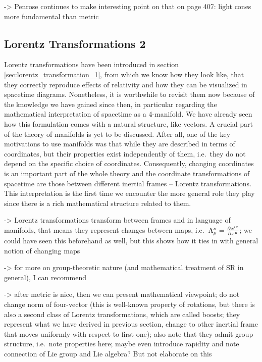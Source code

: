 \documentclass[../relativity_main.tex]{subfiles}
\begin{document}



-> Penrose continues to make interesting point on that on page 407: light cones more fundamental than metric



		\subsection{Lorentz Transformations 2}\label{subsec:lorentz_transformation_2}
Lorentz transformations have been introduced in section \ref{sec:lorentz_transformation_1}, from which we know how they look like, that they correctly reproduce effects of relativity and how they can be visualized in spacetime diagrams. Nonetheless, it is worthwhile to revisit them now because of the knowledge we have gained since then, in particular regarding the mathematical interpretation of spacetime as a 4-manifold. We have already seen how this formulation comes with a natural structure, like vectors. A crucial part of the theory of manifolds is yet to be discussed. After all, one of the key motivations to use manifolds was that while they are described in terms of coordinates, but their properties exist independently of them, i.e.~they do not depend on the specific choice of coordinates. Consequently, changing coordinates is an important part of the whole theory and the coordinate transformations of spacetime are those between different inertial frames -- Lorentz transformations. This interpretation is the first time we encounter the more general role they play since there is a rich mathematical structure related to them.



-> Lorentz transformations transform between frames and in language of manifolds, that means they represent changes between maps, i.e.~$\Lambda_\mu^\nu = \pdv{x'^\nu}{x^\mu}$; we could have seen this beforehand as well, but this shows how it ties in with general notion of changing maps



-> for more on group-theoretic nature (and mathematical treatment of SR in general), I can recommend \cite{giulini_srt_indepth}



-> after metric is nice, then we can present mathematical viewpoint; do not change norm of four-vector (this is well-known property of rotations, but there is also a second class of Lorentz transformations, which are called boosts; they represent what we have derived in previous section, change to other inertial frame that moves uniformly with respect to first one); also note that they admit group structure, i.e.~note properties here; maybe even introduce rapidity and note connection of Lie group and Lie algebra? But not elaborate on this
\end{document}
